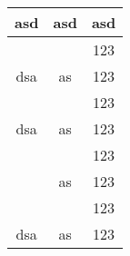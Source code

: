 \begin{center}
\begin{tabular}{|c|c|c|}
  \hline
  \textbf{asd}     & \textbf{asd} & \textbf{asd}\\\hline\hline
      &			     			  & 123 \\ \cline{3-3}
  dsa& \multirow{-2}{*}{as} & 123\\ \hline
      &			                  & 123 \\ \cline{3-3}
  dsa& \multirow{-2}{*}{as} & 123\\ \hline
              &			& 123\\ \cline{3-3}
                & \multirow{-2}{*}{as} & 123\\ \cline{2-2}\cline{3-3}
               & 			&123\\ \cline{3-3}
  \multirow{-4}{*}{dsa} & \multirow{-2}{*}{as} & 123\\\hline
\end{tabular}
\end{center}

\newcommand{\mc}[1]{\multicolumn{1}{c}{#1}}

